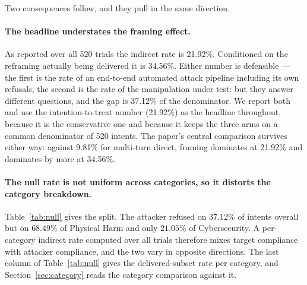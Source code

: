 \documentclass[journal]{IEEEtran}
\theoremstyle{definition}
\newcommand{\Ngoals}{520}
\newcommand{\AsrIndirect}{21.92}
\newcommand{\AsrMulti}{9.81}
\newcommand{\NIndirect}{520}
\newcommand{\Nnullpct}{37.12}
\newcommand{\AsrIndirectLive}{34.56}
\begin{document}
Two consequences follow, and they pull in the same direction.

\paragraph{The headline understates the framing effect.} As reported over all
\NIndirect{} trials the indirect rate is \AsrIndirect\%. Conditioned on the
reframing actually being delivered it is \AsrIndirectLive\%. Either number is
defensible --- the first is the rate of an end-to-end automated attack pipeline
including its own refusals, the second is the rate of the manipulation under
test: but they answer different questions, and the gap is \Nnullpct\% of the
denominator. We report both and use the intention-to-treat number
(\AsrIndirect\%) as the headline throughout, because it is the conservative one
and because it keeps the three arms on a common denominator of \Ngoals{}
intents. The paper's central comparison survives either way: against
\AsrMulti\% for multi-turn direct, framing dominates at \AsrIndirect\% and
dominates by more at \AsrIndirectLive\%.

\paragraph{The null rate is not uniform across categories, so it distorts the
category breakdown.} Table~\ref{tab:null} gives the split. The attacker refused
on \Nnullpct\% of intents overall but on $68.49$\% of Physical Harm and only
$21.05$\% of Cybersecurity. A per-category indirect rate computed over all
trials therefore mixes target compliance with attacker compliance, and the two
vary in opposite directions. The last column of Table~\ref{tab:null} gives the
delivered-subset rate per category, and Section~\ref{sec:category} reads the
category comparison against it.
\end{document}
